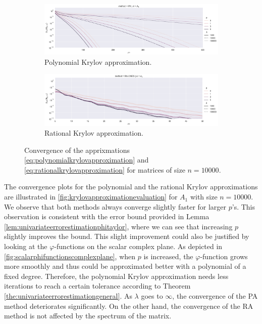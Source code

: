 \begin{figure}[h!]
    \centering
    \begin{subfigure}[b]{.9\textwidth}
        \includegraphics[width=\textwidth]{img/krylovapproximation/cnvg_ps_PA_n10000.png}
        \caption{Polynomial Krylov approximation.}
        \label{fig:polynomialkrylovapproximationevaluation}
    \end{subfigure}
    \vfill
    \begin{subfigure}[b]{.9\textwidth}
        \includegraphics[width=\textwidth]{img/krylovapproximation/cnvg_ps_RA_n10000.png}
        \caption{Rational Krylov approximation.}
        \label{fig:rationalkrylovapproximationevaluation}
    \end{subfigure}
    \caption{
        Convergence of the apprixmations \eqref{eq:polynomialkrylovapproximation}
        and \eqref{eq:rationalkrylovapproximation} for matrices of size $n=10000$.
    }
    \label{fig:krylovapproximationevaluation}
\end{figure}

The convergence plots for the polynomial and the rational Krylov approximations are
illustrated in \autoref{fig:krylovapproximationevaluation} for $A_1$ with size $n=10000$.
We observe that both methods always converge slightly faster for larger $p$'s.
This observation is consistent with the error bound provided in Lemma
\ref{lem:univariateerrorestimationphitaylor}, where we can see that increasing $p$ slightly
improves the bound. This slight improvement could also be justified by looking at the
$\varphi$-functions on the scalar complex plane. As depicted in
\autoref{fig:scalarphifunctionscomplexplane}, when $p$ is increased, the
$\varphi$-function grows more smoothly and thus could be approximated better with a
polynomial of a fixed degree. Therefore, the polynomial Krylov approximation needs
less iterations to reach a certain tolerance according to Theorem
\ref{the:univariateerrorestimationgeneral}.
As $\lambda$ goes to $\infty$, the convergence of the PA method deteriorates significantly.
On the other hand, the convergence of the RA method is not affected by the spectrum
of the matrix.

